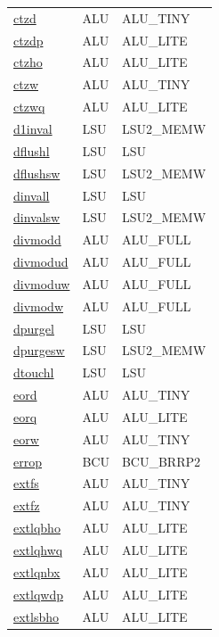 \begin{small}
\begin{longtable}[l]{l l l}
\hyperlink{lvx.ctzd}{ctzd} & ALU & ALU\_TINY \\ 
\hyperlink{lvx.ctzdp}{ctzdp} & ALU & ALU\_LITE \\ 
\hyperlink{lvx.ctzho}{ctzho} & ALU & ALU\_LITE \\ 
\hyperlink{lvx.ctzw}{ctzw} & ALU & ALU\_TINY \\ 
\hyperlink{lvx.ctzwq}{ctzwq} & ALU & ALU\_LITE \\ 
\hyperlink{lvx.d1inval}{d1inval} & LSU & LSU2\_MEMW \\ 
\hyperlink{lvx.dflushl}{dflushl} & LSU & LSU \\ 
\hyperlink{lvx.dflushsw}{dflushsw} & LSU & LSU2\_MEMW \\ 
\hyperlink{lvx.dinvall}{dinvall} & LSU & LSU \\ 
\hyperlink{lvx.dinvalsw}{dinvalsw} & LSU & LSU2\_MEMW \\ 
\hyperlink{lvx.divmodd}{divmodd} & ALU & ALU\_FULL \\ 
\hyperlink{lvx.divmodud}{divmodud} & ALU & ALU\_FULL \\ 
\hyperlink{lvx.divmoduw}{divmoduw} & ALU & ALU\_FULL \\ 
\hyperlink{lvx.divmodw}{divmodw} & ALU & ALU\_FULL \\ 
\hyperlink{lvx.dpurgel}{dpurgel} & LSU & LSU \\ 
\hyperlink{lvx.dpurgesw}{dpurgesw} & LSU & LSU2\_MEMW \\ 
\hyperlink{lvx.dtouchl}{dtouchl} & LSU & LSU \\ 
\hyperlink{lvx.eord}{eord} & ALU & ALU\_TINY \\ 
\hyperlink{lvx.eorq}{eorq} & ALU & ALU\_LITE \\ 
\hyperlink{lvx.eorw}{eorw} & ALU & ALU\_TINY \\ 
\hyperlink{lvx.errop}{errop} & BCU & BCU\_BRRP2 \\ 
\hyperlink{lvx.extfs}{extfs} & ALU & ALU\_TINY \\ 
\hyperlink{lvx.extfz}{extfz} & ALU & ALU\_TINY \\ 
\hyperlink{lvx.extlqbho}{extlqbho} & ALU & ALU\_LITE \\ 
\hyperlink{lvx.extlqhwq}{extlqhwq} & ALU & ALU\_LITE \\ 
\hyperlink{lvx.extlqnbx}{extlqnbx} & ALU & ALU\_LITE \\ 
\hyperlink{lvx.extlqwdp}{extlqwdp} & ALU & ALU\_LITE \\ 
\hyperlink{lvx.extlsbho}{extlsbho} & ALU & ALU\_LITE \\ 

\end{longtable}
\end{small}
